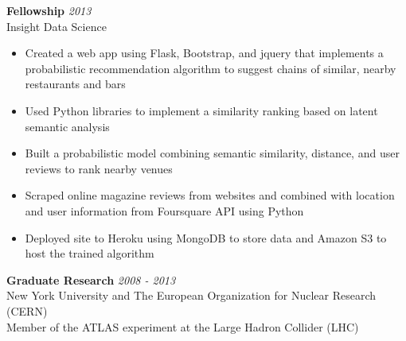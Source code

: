 \documentclass[9pt]{article}
\newenvironment{changemargin}[2]{%
  \begin{list}{}{%
    \setlength{\topsep}{0pt}%
    \setlength{\leftmargin}{#1}%
    \setlength{\rightmargin}{#2}%
    \setlength{\listparindent}{\parindent}%
    \setlength{\itemindent}{\parindent}%
    \setlength{\parsep}{\parskip}%
  }%
  \item[]}{\end{list}
}
\newenvironment{body} {
	\vspace*{-16pt}
	\begin{changemargin}{-0.25in}{-0.5in}
  }	
	{\end{changemargin}
}
\begin{document}
\begin{body}
	\vspace{14pt}
	\textbf{Fellowship} \hfill \emph{2013}\\
        Insight Data Science
        \begin{itemize}
        \item Created a web app using Flask, Bootstrap, and jquery that implements a probabilistic recommendation algorithm to suggest chains of similar, nearby restaurants and bars \\
        \item Used Python libraries to implement a similarity ranking based on latent semantic analysis \\
        \item Built a probabilistic model combining semantic similarity, distance, and user reviews to rank nearby venues \\
        \item Scraped online magazine reviews from websites and combined with location and user information from Foursquare API using Python \\
        \item Deployed site to Heroku using MongoDB to store data and Amazon S3 to host the trained algorithm \\

        \end{itemize}

        \medskip

	\textbf{Graduate Research} \hfill \emph{2008 - 2013}\\
	New York University and The European Organization for Nuclear Research (CERN) \\
        Member of the ATLAS experiment at the Large Hadron Collider (LHC) \\

        \medskip


\end{body}
\end{document}
